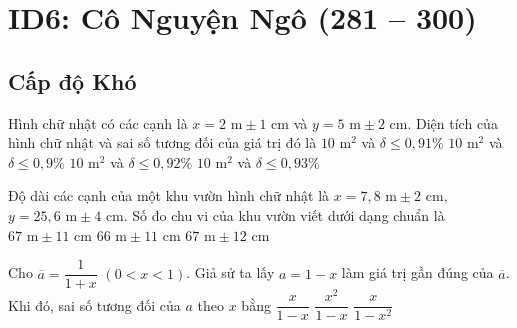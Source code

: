 \section*{ID6: Cô Nguyện Ngô (281 -- 300)}
\subsection*{Cấp độ Khó}
\begin{ex}%
	Hình chữ nhật có các cạnh là $x = 2\text{\ m} \pm 1 \text{\ cm}$ và $y = 5 \text{\ m} \pm 2 \text{\ cm}$. Diện tích của hình chữ nhật và sai số tương đối của giá trị đó là
	\choice
	{$10 \text{\ m}^2$ và $\delta \leq 0{,}91 \%$}
	{\True $10 \text{\ m}^2$ và $\delta \leq 0{,}9 \%$}
	{$10 \text{\ m}^2$ và $\delta \leq 0{,}92 \%$}
	{$10 \text{\ m}^2$ và $\delta \leq 0{,}93 \%$}
\end{ex}

\begin{ex}%
	Độ dài các cạnh của một khu vườn hình chữ nhật là $x= 7{,}8 \text{\ m} \pm 2 \text{\ cm}$, $y = 25{,}6 \text{\ m} \pm 4 \text{\ cm}$. Số đo chu vi của khu vườn viết dưới dạng chuẩn là
	{$67 \text{\ m} \pm 11\text{\ cm}$}
	{$66\text{\ m} \pm 11 \text{\ cm}$}
	{$67 \text{\ m} \pm 12 \text{\ cm}$}
\end{ex}

\begin{ex}%
	Cho $\overline{a} = \dfrac{1}{1+x}$ $(0 < x < 1)$. Giả sử ta lấy $a = 1- x$ làm giá trị gần đúng của $\overline{a}$. Khi đó, sai số tương đối của $a$ theo $x$ bằng
	{$\dfrac{x}{1-x}$}
	{$\dfrac{x^2}{1-x}$}
	{$\dfrac{x}{1-x^2}$}
\end{ex}

